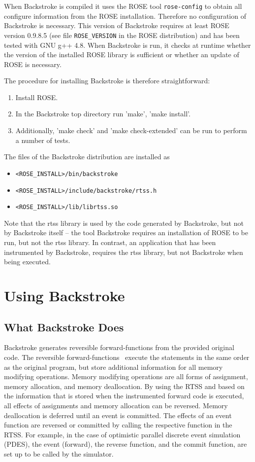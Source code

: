 \documentclass[english,12pt, titlepage]{article}      %
\newcommand{\forwardfunctions}{forward-functions}
\begin{document}
When Backstroke is compiled it uses the ROSE tool \verb+rose-config+
to obtain all configure information from the ROSE
installation. Therefore no configuration of Backstroke is necessary.
This version of Backstroke requires at least ROSE version 0.9.8.5 (see
file \verb+ROSE_VERSION+ in the ROSE distribution) and has been tested
with GNU g++ 4.8. When Backstroke is run, it checks at runtime whether the
version of the installed ROSE library is sufficient or whether an
update of ROSE is necessary.

The procedure for installing Backstroke is therefore straightforward:
\begin{enumerate}
\item Install ROSE.
\item In the Backstroke top directory run 'make', 'make install'.
\item Additionally, 'make check' and 'make check-extended' can be run to perform a number of tests.
\end{enumerate}

The files of the Backstroke distribution are installed as

\begin{itemize}
\item \verb+<ROSE_INSTALL>/bin/backstroke+
\item \verb+<ROSE_INSTALL>/include/backstroke/rtss.h+
\item \verb+<ROSE_INSTALL>/lib/librtss.so+
\end{itemize}

Note that the rtss library is used by the code generated by
Backstroke, but not by Backstroke itself -- the tool Backstroke
requires an installation of ROSE to be run, but not the rtss
library. In contrast, an application that has been instrumented by
Backstroke, requires the rtss library, but not Backstroke when being
executed.

\section{Using Backstroke}

\subsection{What Backstroke Does}

Backstroke generates reversible \forwardfunctions{} from the provided
original code. The reversible \forwardfunctions~ execute the statements in the
same order as the original program, but store additional information
for all memory modifying operations. Memory modifying operations are
all forms of assignment, memory allocation, and memory
deallocation. By using the RTSS and based on the information that is
stored when the instrumented forward code is executed, all effects of
assignments and memory allocation can be reversed. Memory deallocation
is deferred until an event is committed. The effects of an event
function are reversed or committed by calling the respective function
in the RTSS. For example, in the case of optimistic parallel discrete
event simulation (PDES), the event (forward), the reverse function,
and the commit function, are set up to be called by the simulator.
\end{document}
